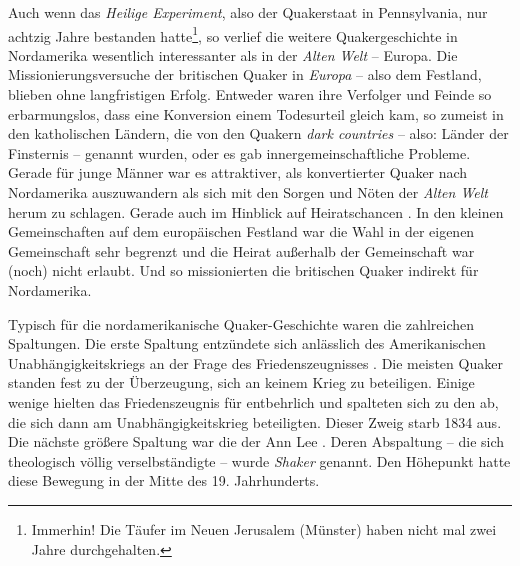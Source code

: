 \medskip

Auch wenn das \textit{Heilige Experiment}, also der Quakerstaat in Pennsylvania,
nur achtzig Jahre
bestanden hatte\footnote{Immerhin! Die Täufer im Neuen Jerusalem (Münster)
  haben
nicht mal zwei Jahre durchgehalten.}, so verlief die weitere
Quakergeschichte in Nordamerika wesentlich interessanter als in der
\textit{Alten
Welt} -- Europa. Die Missionierungsversuche  der britischen
Quaker in
\textit{Europa}  -- also dem Festland, blieben ohne
langfristigen Erfolg.
Entweder waren ihre Verfolger  und Feinde so erbarmungslos,
dass eine
Konversion einem Todesurteil gleich kam, so zumeist in den katholischen
Ländern, die von den Quakern \textit{dark countries} -- also: Länder der
Finsternis -- genannt wurden, oder es gab innergemeinschaftliche Probleme.
Gerade
für junge Männer war es attraktiver, als konvertierter Quaker nach Nordamerika
auszuwandern als sich mit den Sorgen und Nöten der \textit{Alten Welt} herum
zu
schlagen. Gerade auch im Hinblick auf Heiratschancen . In den
kleinen
Gemeinschaften auf dem europäischen Festland war die Wahl in der eigenen
Gemeinschaft sehr begrenzt und die Heirat außerhalb der Gemeinschaft war (noch)
nicht erlaubt. Und so missionierten die britischen Quaker indirekt für
Nordamerika.

\medskip

Typisch für die nordamerikanische Quaker-Geschichte waren die zahlreichen
Spaltungen. Die erste Spaltung  entzündete sich anlässlich des
Amerikanischen
Unabhängigkeitskriegs an der Frage des Friedenszeugnisses
. Die meisten Quaker
standen fest zu der Überzeugung, sich an keinem Krieg  zu
beteiligen. Einige
wenige hielten das Friedenszeugnis für entbehrlich und spalteten sich zu den
  ab,
die sich dann am Unabhängigkeitskrieg 
beteiligten. Dieser Zweig starb 1834 aus. Die nächste größere Spaltung war die
der Ann Lee . Deren Abspaltung -- die sich theologisch
völlig verselbständigte --
wurde \textit{Shaker}  genannt. Den Höhepunkt hatte
diese Bewegung in der Mitte
des 19. Jahrhunderts.

\medskip

